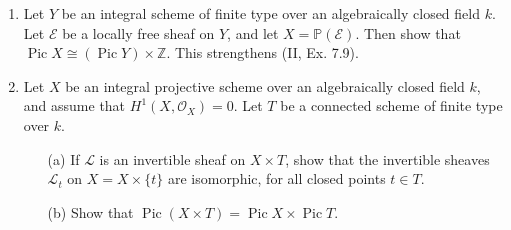 \documentclass{article}
\newcommand{\fE}{\mathscr{E}}
\newcommand{\fO}{\mathscr{O}}
\newcommand{\fL}{\mathscr{L}}
\newcommand{\PP}{\mathbb{P}}
\newcommand{\Z}{\mathbb{Z}}
\DeclareMathOperator{\pic}{Pic}
\begin{document}
\begin{enumerate} [label=\textbf{\arabic*.}, leftmargin=0em]
\item Let $Y$ be an integral scheme of finite type over an algebraically closed field $k$. Let $\mathscr{E}$ be a locally free sheaf on $Y$, and let $X = \PP(\fE)$. Then show that $\pic{X} \cong (\pic{Y}) \times \Z$. This strengthens (II, Ex. 7.9).

\item Let $X$ be an integral projective scheme over an algebraically closed field $k$, and assume that $H^1(X, \fO_X) = 0$. Let $T$ be a connected scheme of finite type over $k$.
\begin{itemize}
  \item[(a)] If $\fL$ is an invertible sheaf on $X \times T$, show that the invertible sheaves $\fL_t$ on $X = X \times \{ t \}$ are isomorphic, for all closed points $t \in T$.
  \item[(b)] Show that $\pic(X \times T) = \pic{X} \times \pic{T}$.
\end{itemize}

\end{enumerate}
\end{document}
